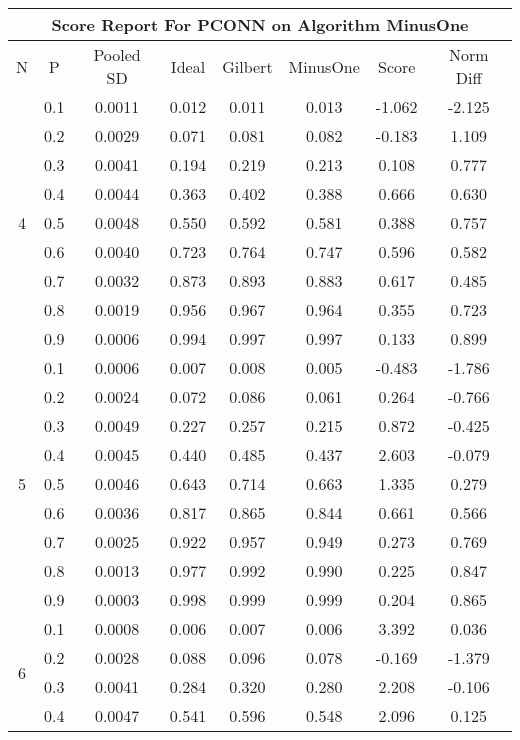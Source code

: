 \documentclass[11pt,a4paper]{report}
\begin{document}
\begin{longtable}{ | c | c || c | c | c | c | c | c | }
\hline
\multicolumn{8}{|c|}{ Score Report For PCONN on Algorithm MinusOne} \\
\hline
N & P & Pooled SD &  Ideal &  Gilbert & MinusOne  & Score & Norm Diff \\
 \hline
 \hline
 \endhead
\multirow{9}{*}{4} & 0.1 & 0.0011 & 0.012 & 0.011 & 0.013 & -1.062 & -2.125 \\
 & 0.2 & 0.0029 & 0.071 & 0.081 & 0.082 & -0.183 & 1.109 \\
 & 0.3 & 0.0041 & 0.194 & 0.219 & 0.213 & 0.108 & 0.777 \\
 & 0.4 & 0.0044 & 0.363 & 0.402 & 0.388 & 0.666 & 0.630 \\
 & 0.5 & 0.0048 & 0.550 & 0.592 & 0.581 & 0.388 & 0.757 \\
 & 0.6 & 0.0040 & 0.723 & 0.764 & 0.747 & 0.596 & 0.582 \\
 & 0.7 & 0.0032 & 0.873 & 0.893 & 0.883 & 0.617 & 0.485 \\
 & 0.8 & 0.0019 & 0.956 & 0.967 & 0.964 & 0.355 & 0.723 \\
 & 0.9 & 0.0006 & 0.994 & 0.997 & 0.997 & 0.133 & 0.899 \\
 \hline
\multirow{9}{*}{5} & 0.1 & 0.0006 & 0.007 & 0.008 & 0.005 & -0.483 & -1.786 \\
 & 0.2 & 0.0024 & 0.072 & 0.086 & 0.061 & 0.264 & -0.766 \\
 & 0.3 & 0.0049 & 0.227 & 0.257 & 0.215 & 0.872 & -0.425 \\
 & 0.4 & 0.0045 & 0.440 & 0.485 & 0.437 & 2.603 & -0.079 \\
 & 0.5 & 0.0046 & 0.643 & 0.714 & 0.663 & 1.335 & 0.279 \\
 & 0.6 & 0.0036 & 0.817 & 0.865 & 0.844 & 0.661 & 0.566 \\
 & 0.7 & 0.0025 & 0.922 & 0.957 & 0.949 & 0.273 & 0.769 \\
 & 0.8 & 0.0013 & 0.977 & 0.992 & 0.990 & 0.225 & 0.847 \\
 & 0.9 & 0.0003 & 0.998 & 0.999 & 0.999 & 0.204 & 0.865 \\
 \hline
\multirow{9}{*}{6} & 0.1 & 0.0008 & 0.006 & 0.007 & 0.006 & 3.392 & 0.036 \\
 & 0.2 & 0.0028 & 0.088 & 0.096 & 0.078 & -0.169 & -1.379 \\
 & 0.3 & 0.0041 & 0.284 & 0.320 & 0.280 & 2.208 & -0.106 \\
 & 0.4 & 0.0047 & 0.541 & 0.596 & 0.548 & 2.096 & 0.125 \\

\end{longtable}
\end{document}
